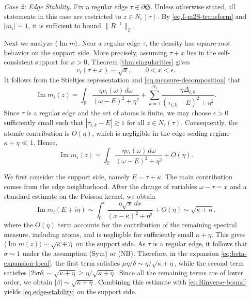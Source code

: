 \documentclass[11pt,twoside, a4paper]{article}
\numberwithin{equation}{section}
\numberwithin{figure}{section}
\theoremstyle{plain} %
\theoremstyle{definition}
\theoremstyle{remark}
\newcommand{\1} {\mspace{1 mu}}
\newcommand{\2} {\mspace{2 mu}}
\DeclareMathOperator{\im}{Im}
\begin{document}
\medskip

\textit{Case 2: Edge Stability.} Fix a regular edge $\tau\in\partial\mathfrak{S}$. Unless otherwise stated, all statements in this case are restricted to $z\in N_\epsilon(\tau)$.
By \eqref{eq.I-m2S-transform} and $|m_i|\sim 1$, it is sufficient to bound $\|R^{-1}\|_2$. 






Next we analyze $\langle\im m\rangle$. 
Near a regular edge \(\tau\), the density has square-root behavior on the
support side. More precisely, assuming \(\tau+ x\) lies in the self-consistent support for \(x>0\), Theorem \ref{thm:singularities} gives
\[
    v_i(\tau+ x)\sim \sqrt{x},
    \qquad 0<x<\epsilon .
\]
It follows from the Stieltjes representation and
\eqref{eq.measure-decomposition} that
\[
    \im m_i(z)
    =
    \int_{\mathbb R}
    \frac{\eta v_i(\omega)\,d\omega}
    {(\omega-E)^2+\eta^2}
    +
    \sum_{k=1}^{N_i}
    \frac{\eta\Delta_{i,k}}
    {(\tau_{i,k}-E)^2+\eta^2}.
\]
Since $\tau$ is a regular edge and the set of atoms is finite,
we may choose $\epsilon>0$ sufficiently small such that
$|\tau_{i,k}-E|\gtrsim 1$ for all $z\in N_\epsilon(\tau)$.
Consequently, the atomic contribution is $O(\eta)$,
which is negligible in the edge scaling regime
$\kappa+\eta\ll 1$. Hence,
\[
    \im m_i(z)
    =
    \int_{\mathbb R}
    \frac{\eta v_i(\omega)\,d\omega}
    {(\omega-E)^2+\eta^2}
    +O(\eta).
\]

We first consider the support side, namely \(E=\tau+\kappa\). The main
contribution comes from the edge neighborhood. After the change of variables $\omega-\tau=x$ and a standard estimate on the Poisson kernel, we obtain
\[
    \im m_i(E+i\eta)
    \sim
    \int_0^\epsilon
    \frac{\eta \sqrt{x}\,dx}{(x-\kappa)^2+\eta^2}+O(\eta)\sim \sqrt{\kappa+\eta},
\]
where the $O(\eta)$ term accounts for the contribution of
the remaining spectral measure, including atoms, and is
negligible for sufficiently small $\kappa+\eta$.
This gives
$
    \langle \im m(z)\rangle
    \sim
    \sqrt{\kappa+\eta}
$
on the support side. As $\tau$ is a regular edge, it follows that $\sigma\sim 1$ under the assumption (Sym) or (NB). Therefore, in the expansion \eqref{eq:beta-expansion-local}, the first term satisfies $\mu\eta/\delta\sim \eta/\sqrt{\kappa+\eta}$, while the second term satisfies $|2\mathrm i\sigma\delta|\sim\sqrt{\kappa+\eta}\ge\eta/\sqrt{\kappa+\eta}$. Since all the remaining terms are of lower order, we obtain $|\beta|\sim\sqrt{\kappa+\eta}$. Combining this estimate with \eqref{eq.Rinverse-bound} yields \eqref{eq.edge-stability} on the support side.
\end{document}
